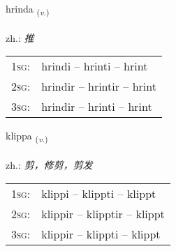 \documentclass[frontgrid, backgrid]{flacards}\usepackage[]{graphicx}\usepackage[]{xcolor}
\begin{document}
\renewcommand{\flhead}{\vskip5pt \fboxsep=0pt {\small\bfseries\footnotesize Sagnorð | 动词}}
\renewcommand{\fcfoot}{\vskip5pt \fboxsep=0pt \hspace{2pt}{\small\bfseries\footnotesize 3K}}

\renewcommand{\blhead}{\vskip5pt {\small\bfseries\footnotesize Sagnorð | 动词 }}
\renewcommand{\bcfoot}{\vskip5pt \hspace{2pt}{\small\bfseries\footnotesize 3K}}


{hrinda \small{\textsubscript{(\textit{v.})}} \\[1ex] %
\textphonetic{[r̥ɪnta]} \\
zh.: \emph{推} \\  [2ex]
\renewcommand*{\arraystretch}{0.8}
\begin{tabular}{p{1cm}l}
\textsc{1sg}: & hrindi -- hrinti -- hrint \\ 
\textsc{2sg}: & hrindir -- hrintir -- hrint \\ 
\textsc{3sg}: & hrindir -- hrinti -- hrint \\ 
\end{tabular}
}

\renewcommand{\flhead}{\vskip5pt \fboxsep=0pt {\small\bfseries\footnotesize Sagnorð | 动词}}
\renewcommand{\fcfoot}{\vskip5pt \fboxsep=0pt \hspace{2pt}{\small\bfseries\footnotesize 3K}}

\renewcommand{\blhead}{\vskip5pt {\small\bfseries\footnotesize Sagnorð | 动词 }}
\renewcommand{\bcfoot}{\vskip5pt \hspace{2pt}{\small\bfseries\footnotesize 3K}}


{klippa \small{\textsubscript{(\textit{v.})}} \\[1ex] %
\textphonetic{[kʰlɪhpa]} \\
zh.: \emph{剪，修剪，剪发} \\  [2ex]
\renewcommand*{\arraystretch}{0.8}
\begin{tabular}{p{1cm}l}
\textsc{1sg}: & klippi -- klippti -- klippt \\ 
\textsc{2sg}: & klippir -- klipptir -- klippt \\ 
\textsc{3sg}: & klippir -- klippti -- klippt \\ 
\end{tabular}
}
\end{document}
